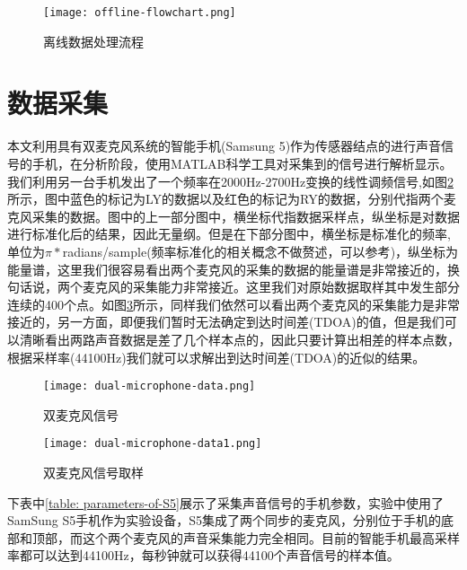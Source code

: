 \documentclass[winfonts]{njuthesis}
\begin{document}
		\begin{figure}[H]
			\centering
			\caption{离线数据处理流程}
			\texttt{[image: offline-flowchart.png]} 
			\label{fig: offline-flowchart}
		\end{figure}
	
	\section{数据采集}
		本文利用具有双麦克风系统的智能手机(Samsung 5)作为传感器结点的进行声音信号的手机，在分析阶段，使用MATLAB科学工具对采集到的信号进行解析显示。我们利用另一台手机发出了一个频率在2000Hz-2700Hz变换的线性调频信号,如图\ref{fig: dual-microphone-data}所示，图中蓝色的标记为LY的数据以及红色的标记为RY的数据，分别代指两个麦克风采集的数据。图中的上一部分图中，横坐标代指数据采样点，纵坐标是对数据进行标准化后的结果，因此无量纲。但是在下部分图中，横坐标是标准化的频率,单位为$\pi * $radians/sample(频率标准化的相关概念不做赘述，可以参考\cite{Normalized_frequency})，纵坐标为能量谱，这里我们很容易看出两个麦克风的采集的数据的能量谱是非常接近的，换句话说，两个麦克风的采集能力非常接近。这里我们对原始数据取样其中发生部分连续的400个点。如图\ref{fig: dual-microphone-data1}所示，同样我们依然可以看出两个麦克风的采集能力是非常接近的，另一方面，即便我们暂时无法确定到达时间差(TDOA)的值，但是我们可以清晰看出两路声音数据是差了几个样本点的，因此只要计算出相差的样本点数，根据采样率(44100Hz)我们就可以求解出到达时间差(TDOA)的近似的结果。
		
		\begin{figure}[H]
			\centering
			\texttt{[image: dual-microphone-data.png]} 
			\caption{双麦克风信号}
			\label{fig: dual-microphone-data}
		\end{figure}
	
		\begin{figure}[H]
			\centering
			\texttt{[image: dual-microphone-data1.png]} 
			\caption{双麦克风信号取样}
			\label{fig: dual-microphone-data1}
		\end{figure}
		
		下表中\ref{table: parameters-of-S5}展示了采集声音信号的手机参数，实验中使用了SamSung S5手机作为实验设备，S5集成了两个同步的麦克风，分别位于手机的底部和顶部，而这个两个麦克风的声音采集能力完全相同。目前的智能手机最高采样率都可以达到44100Hz，每秒钟就可以获得44100个声音信号的样本值。
		
\end{document}
